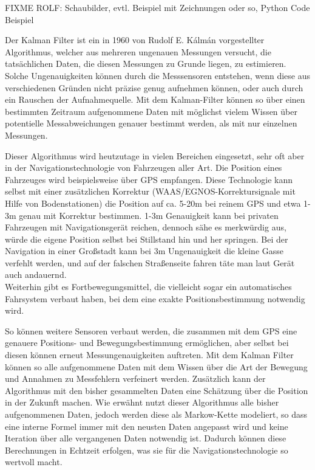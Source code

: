 \documentclass[12pt,a4paper,ngerman]{scrartcl}
\begin{document}
{\color{red} FIXME ROLF: Schaubilder, evtl. Beispiel mit Zeichnungen oder so, Python Code Beispiel}

Der Kalman Filter ist ein in 1960 von Rudolf E. Kálmán vorgestellter Algorithmus, welcher aus mehreren ungenauen Messungen versucht, die tatsächlichen Daten, die diesen Messungen zu Grunde liegen, zu estimieren.\cite{kalman} Solche Ungenauigkeiten können durch die Messsensoren entstehen, wenn diese aus verschiedenen Gründen nicht präzise genug aufnehmen können, oder auch durch ein Rauschen der Aufnahmequelle. Mit dem Kalman-Filter können so über einen bestimmten Zeitraum aufgenommene Daten mit möglichst vielem Wissen über potentielle Messabweichungen genauer bestimmt werden, als mit nur einzelnen Messungen.

Dieser Algorithmus wird heutzutage in vielen Bereichen eingesetzt, sehr oft aber in der Navigationstechnologie von Fahrzeugen aller Art. Die Position eines Fahrzeuges wird beispielsweise über GPS empfangen. Diese Technologie kann selbst mit einer zusätzlichen Korrektur (WAAS/EGNOS-Korrektursignale mit Hilfe von Bodenstationen\cite{waas}\cite{egnos}) die Position auf ca. 5-20m bei reinem GPS und etwa 1-3m genau mit Korrektur bestimmen. 1-3m Genauigkeit kann bei privaten Fahrzeugen mit Navigationsgerät reichen, dennoch sähe es merkwürdig aus, würde die eigene Position selbst bei Stillstand hin und her springen. Bei der Navigation in einer Großstadt kann bei 3m Ungenauigkeit die kleine Gasse verfehlt werden, und auf der falschen Straßenseite fahren täte man laut Gerät auch andauernd.\\
Weiterhin gibt es Fortbewegungsmittel, die vielleicht sogar ein automatisches Fahrsystem verbaut haben, bei dem eine exakte Positionsbestimmung notwendig wird.

So können weitere Sensoren verbaut werden, die zusammen mit dem GPS eine genauere Positions- und Bewegungsbestimmung ermöglichen, aber selbst bei diesen können erneut Messungenauigkeiten auftreten. Mit dem Kalman Filter können so alle aufgenommene Daten mit dem Wissen über die Art der Bewegung und Annahmen zu Messfehlern verfeinert werden. Zusätzlich kann der Algorithmus mit den bisher gesammelten Daten eine Schätzung über die Position in der Zukunft machen. Wie erwähnt nutzt dieser Algorithmus alle bisher aufgenommenen Daten, jedoch werden diese als Markow-Kette modeliert, so dass eine interne Formel immer mit den neusten Daten angepasst wird und keine Iteration über alle vergangenen Daten notwendig ist. Dadurch können diese Berechnungen in Echtzeit erfolgen, was sie für die Navigationstechnologie so wertvoll macht.
\end{document}
